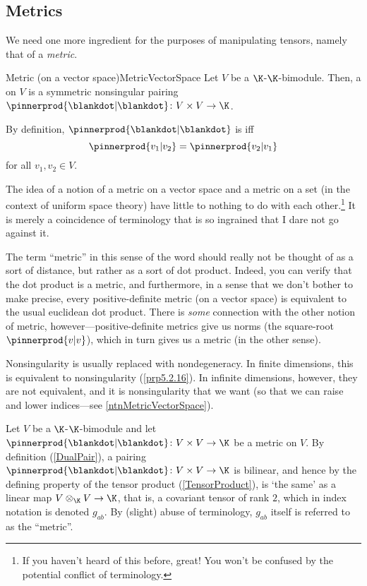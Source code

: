 \subsection{Metrics}

We need one more ingredient for the purposes of manipulating tensors, namely that of a \emph{metric}.
\begin{dfn}{Metric (on a vector space)}{MetricVectorSpace}
	Let $V$ be a $\K$-$\K$-bimodule.  Then, a  on $V$ is a symmetric nonsingular pairing $\pinnerprod{\blankdot |\blankdot}\colon V\times V\rightarrow \K$.
	\begin{rmk}
		By definition, $\pinnerprod{\blankdot |\blankdot}$ is  iff
		\begin{equation}
			\pinnerprod{v_1|v_2}=\pinnerprod{v_2|v_1}
		\end{equation}
		for all $v_1,v_2\in V$.
	\end{rmk}
	\begin{rmk}
		The idea of a notion of a metric on a vector space and a metric on a set (in the context of uniform space theory) have little to nothing to do with each other.\footnote{If you haven't heard of this before, great!  You won't be confused by the potential conflict of terminology.}  It is merely a coincidence of terminology that is so ingrained that I dare not go against it.
		
		The term ``metric'' in this sense of the word should really not be thought of as a sort of distance, but rather as a sort of dot product.  Indeed, you can verify that the dot product is a metric, and furthermore, in a sense that we don't bother to make precise, every positive-definite metric (on a vector space) is equivalent to the usual euclidean dot product.  There is \emph{some} connection with the other notion of metric, however---positive-definite metrics give us norms (the square-root $\pinnerprod{v|v}$), which in turn gives us a metric (in the other sense).
	\end{rmk}
	\begin{rmk}
		Nonsingularity is usually replaced with nondegeneracy.  In finite dimensions, this is equivalent to nonsingularity (\cref{prp5.2.16}).  In infinite dimensions, however, they are not equivalent, and it is nonsingularity that we want (so that we can raise and lower indices---see \cref{ntnMetricVectorSpace}).
	\end{rmk}
\end{dfn}
Let $V$ be a᪞$\K$-$\K$-bimodule and let $\pinnerprod{\blankdot |\blankdot}\colon V\times V\rightarrow \K$ be a metric on $V$.  By definition (\cref{DualPair}), a pairing $\pinnerprod{\blankdot |\blankdot}\colon V\times V\rightarrow \K$ is bilinear, and hence by the defining property of the tensor product (\cref{TensorProduct}), is `the same' as a linear map $V\otimes _{\K}V\rightarrow \K$, that is, a covariant tensor of rank $2$, which in index  notation is denoted $g_{ab}$.  By (slight) abuse of terminology, $g_{ab}$ itself is referred to as the ``metric''. 
